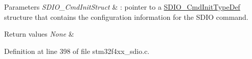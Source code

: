 \begin{DoxyParams}{Parameters}
{\em S\-D\-I\-O\-\_\-\-Cmd\-Init\-Struct} & \-: pointer to a \hyperlink{struct_s_d_i_o___cmd_init_type_def}{S\-D\-I\-O\-\_\-\-Cmd\-Init\-Type\-Def} structure that contains the configuration information for the S\-D\-I\-O command. \\
\hline
\end{DoxyParams}

\begin{DoxyRetVals}{Return values}
{\em None} & \\
\hline
\end{DoxyRetVals}


Definition at line 398 of file stm32f4xx\-\_\-sdio.\-c.

